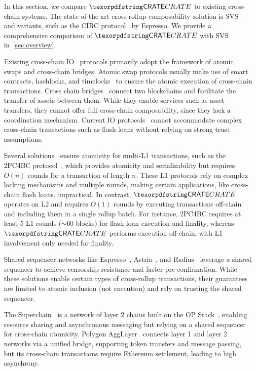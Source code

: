 In this section, we compare $\pname$ to existing cross-chain systems. The state-of-the-art cross-rollup composability solution is SVS~\cite{shared-val-seq-23} and variants, such as the CIRC protocol~\cite{espresso-circ-24} by Espresso. We provide a comprehensive comparison of $\pname$ with SVS in~\cref{sec:overview}.

 Existing cross-chain IO~\cite{chainlink-ccip} protocols primarily adopt the framework of atomic swaps and cross-chain bridges. Atomic swap protocols usually make use of smart contracts, hashlocks, and timelocks~\cite{bitcoin-wiki-htlc,wadhwaHeHTLC2023,tsabaryMADHTLC2021} to ensure the atomic execution of cross-chain transactions. Cross chain bridges~\cite{xiew-zkbridge-22, axelar, near-bridge} connect two blockchains and facilitate the transfer of assets between them. While they enable services such as asset transfers, they cannot offer full cross-chain composability, since they lack a coordination mechanism. 
Current IO protocols~\cite{alt-chains-atomic-transfers, bitcoin-wiki-htlc, herlihy-atomic-cc-swaps-18, herlihy-cc-smr-22, sheff-het-paxos-20, anoma-chimera-chains-23} cannot accommodate complex cross-chain transactions such as flash loans without relying on strong trust assumptions.

Several solutions~\cite{lu-atomic-cc-interactions-24, fal-tccsci-23, zakhary-ac3-20} ensure atomicity for multi-L1 transactions, such as the 2PC4BC protocol~\cite{fal-tccsci-23}, which provides atomicity and serializability but requires $O(n)$ rounds for a transaction of length $n$. These L1 protocols rely on complex locking mechanisms and multiple rounds, making certain applications, like cross-chain flash loans, impractical. In contrast, $\pname$ operates on L2 and requires $O(1)$ rounds by executing transactions off-chain and including them in a single rollup batch. 
For instance, 2PC4BC requires at least 5 L1 rounds ($\sim60$ blocks) for flash loan execution and finality, whereas $\pname$ performs execution off-chain, with L1 involvement only needed for finality.



Shared sequencer networks like Espresso~\cite{espresso-docs}, Astria~\cite{astria-docs}, and Radius~\cite{radius-docs} leverage a shared sequencer to achieve censorship resistance and faster pre-confirmation. While these solutions enable certain types of cross-rollup transactions, their guarantees are limited to atomic inclusion (not execution) and rely on trusting the shared sequencer. 


The Superchain~\cite{superchain-explainer} is a network of layer 2 chains built on the OP Stack~\cite{optimism-website}, enabling resource sharing and asynchronous messaging but relying on a shared sequencer for cross-chain atomicity. Polygon AggLayer~\cite{agglayer} connects layer 1 and layer 2 networks via a unified bridge, supporting token transfers and message passing, but its cross-chain transactions require Ethereum settlement, leading to high asynchrony.










